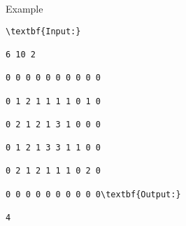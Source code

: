 Example
\begin{verbatim}
\textbf{Input:}

6 10 2

0 0 0 0 0 0 0 0 0 0

0 1 2 1 1 1 1 0 1 0

0 2 1 2 1 3 1 0 0 0

0 1 2 1 3 3 1 1 0 0

0 2 1 2 1 1 1 0 2 0

0 0 0 0 0 0 0 0 0 0\textbf{Output:}

4\end{verbatim}